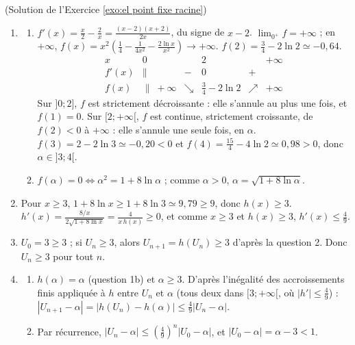 \begin{corrige}
\begin{sol} ~ \\
(Solution de l'Exercice \ref{exo:el point fixe racine})
\begin{enumerate}
\item \begin{enumerate}
      \item $f'(x) = \frac{x}{2} - \frac{2}{x} = \frac{(x-2)(x+2)}{2x}$, du signe de $x - 2$. $\lim_{0^+} f = +\infty$ ;
            en $+\infty$, $f(x) = x^2\left(\frac{1}{4} - \frac{1}{4x^2} - \frac{2\ln x}{x^2}\right) \to +\infty$.
            $f(2) = \frac{3}{4} - 2\ln 2 \simeq -0{,}64$.
            \[
            \begin{array}{c|ccccc}
            x & 0 & & 2 & & +\infty \\ \hline
            f'(x) & \| & - & 0 & + & \\ \hline
            f(x) & \| \; +\infty & \searrow & \frac{3}{4} - 2\ln 2 & \nearrow & +\infty
            \end{array}
            \]
            Sur $]0;2]$, $f$ est strictement d\'ecroissante : elle s'annule au plus une fois, et $f(1) = 0$.
            Sur $[2;+\infty[$, $f$ est continue, strictement croissante, de $f(2) < 0$ \`a $+\infty$ : elle s'annule une seule fois, en $\alpha$.
            $f(3) = 2 - 2\ln 3 \simeq -0{,}20 < 0$ et $f(4) = \frac{15}{4} - 4\ln 2 \simeq 0{,}98 > 0$, donc $\alpha \in ]3;4[$.
      \item $f(\alpha) = 0 \iff \alpha^2 = 1 + 8\ln\alpha$ ; comme $\alpha > 0$, $\alpha = \sqrt{1 + 8\ln \alpha}$.
      \end{enumerate}
\item Pour $x \geq 3$, $1 + 8 \ln x \geq 1 + 8\ln 3 \simeq 9{,}79 \geq 9$, donc $h(x) \geq 3$.
      $h'(x) = \frac{8/x}{2\sqrt{1 + 8\ln x}} = \frac{4}{x\,h(x)} \geq 0$, et comme $x \geq 3$ et $h(x) \geq 3$, $h'(x) \leq \frac{4}{9}$.
\item $U_0 = 3 \geq 3$ ; si $U_n \geq 3$, alors $U_{n+1} = h(U_n) \geq 3$ d'apr\`es la question 2. Donc $U_n \geq 3$ pour tout $n$.
\item \begin{enumerate}
      \item $h(\alpha) = \alpha$ (question 1b) et $\alpha \geq 3$. D'apr\`es l'in\'egalit\'e des accroissements finis appliqu\'ee \`a $h$
            entre $U_n$ et $\alpha$ (tous deux dans $[3;+\infty[$, o\`u $|h'| \leq \frac{4}{9}$) :
            $|U_{n+1} - \alpha| = |h(U_n) - h(\alpha)| \leq \frac{4}{9}|U_n - \alpha|$.
      \item Par r\'ecurrence, $|U_n - \alpha| \leq \left(\frac{4}{9}\right)^n |U_0 - \alpha|$, et $|U_0 - \alpha| = \alpha - 3 < 1$.

\end{enumerate}
\end{enumerate}
\end{sol}
\end{corrige}
